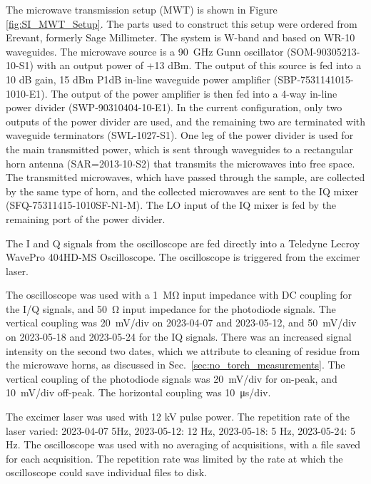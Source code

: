 The microwave transmission setup (MWT) is shown in Figure \ref{fig:SI_MWT_Setup}. The parts used to construct this setup were ordered from Erevant, formerly Sage Millimeter. The system is W-band and based on WR-10 waveguides. The microwave source is a \SI{90}{\giga\hertz} Gunn oscillator (SOM-90305213-10-S1) with an output power of +13 dBm. The output of this source is fed into a 10 dB gain, 15 dBm P1dB in-line waveguide power amplifier (SBP-7531141015-1010-E1). The output of the power amplifier is then fed into a 4-way in-line power divider (SWP-90310404-10-E1). In the current configuration, only two outputs of the power divider are used, and the remaining two are terminated with waveguide terminators (SWL-1027-S1). One leg of the power divider is used for the main transmitted power, which is sent through waveguides to a rectangular horn antenna (SAR=2013-10-S2) that transmits the microwaves into free space. The transmitted microwaves, which have passed through the sample, are collected by the same type of horn, and the collected microwaves are sent to the IQ mixer (SFQ-75311415-1010SF-N1-M). The LO input of the IQ mixer is fed by the remaining port of the power divider. 


The I and Q signals from the oscilloscope are fed directly into a Teledyne Lecroy WavePro 404HD-MS Oscilloscope.  The oscilloscope is triggered from the excimer laser. 

The oscilloscope was used with a \SI{1}{\mega\ohm} input impedance with DC coupling for the I/Q signals, and \SI{50}{\ohm} input impedance for the photodiode signals. The vertical coupling was \SI{20}{\milli\volt/div} on 2023-04-07 and 2023-05-12, and \SI{50}{\milli\volt/div} on 2023-05-18 and 2023-05-24 for the IQ signals. There was an increased signal intensity on the second two dates, which we attribute to cleaning of residue from the microwave horns, as discussed in Sec.\ \ref{sec:no_torch_measurements}. The vertical coupling of the photodiode signals was \SI{20}{\milli\volt/div} for on-peak, and \SI{10}{\milli\volt/div} off-peak. The horizontal coupling was \SI{10}{\micro\second/div}.

The excimer laser was used with 12 kV pulse power. The repetition rate of the laser varied: 2023-04-07 5Hz, 2023-05-12: 12 Hz, 2023-05-18: 5 Hz, 2023-05-24: 5 Hz. The oscilloscope was used with no averaging of acquisitions, with a file saved for each acquisition. The repetition rate was limited by the rate at which the oscilloscope could save individual files to disk. 

